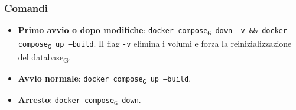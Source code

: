 \documentclass[11pt,a4paper]{article}
\newcommand{\gls}[1]{#1\textsubscript{G}}
\begin{document}
\subsubsection{Comandi}
 
\begin{itemize}
    \item \textbf{Primo avvio o dopo modifiche}: \texttt{\gls{docker compose} down -v \&\& \gls{docker compose} up --build}. Il flag \texttt{-v} elimina i volumi e forza la reinizializzazione del \gls{database}.
    \item \textbf{Avvio normale}: \texttt{\gls{docker compose} up --build}.
    \item \textbf{Arresto}: \texttt{\gls{docker compose} down}.
\end{itemize}
\end{document}

